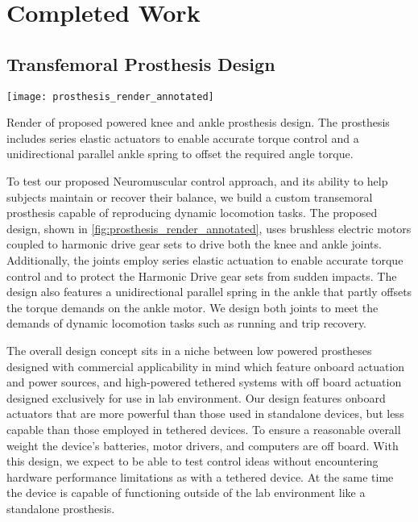 \chapter{Completed Work}\label{sec:completed_work}

\section{Transfemoral Prosthesis Design}\label{sec:completed_design}
\begin{marginfigure}[1.25in]
    \centering
    \texttt{[image: prosthesis\_render\_annotated]}
    \caption{Render of proposed powered knee and ankle prosthesis design. The
    prosthesis includes series elastic actuators to enable accurate torque
    control and a unidirectional parallel ankle spring to offset the required
    angle torque.}\label{fig:prosthesis_render_annotated}
\end{marginfigure} 

To test our proposed Neuromuscular control approach, and its ability to help
subjects maintain or recover their balance, we build a custom transemoral
prosthesis capable of reproducing dynamic locomotion tasks. The proposed design,
shown in \cref{fig:prosthesis_render_annotated}, uses brushless electric motors
coupled to harmonic drive gear sets to drive both the knee and ankle joints.
Additionally, the joints employ series elastic actuation to enable accurate
torque control and to protect the Harmonic Drive gear sets from sudden impacts.
The design also features a unidirectional parallel spring in the ankle that
partly offsets the torque demands on the ankle motor.  We design both joints to
meet the demands of dynamic locomotion tasks such as running and trip recovery.

The overall design concept sits in a niche between low powered prostheses
designed with commercial applicability in mind
\citep{sup2007design,sup2009preliminary,lawson2014robotic,rouse2015design,
martinez2011antagonistic} which feature onboard actuation and power sources, and
high-powered tethered systems \citep{caputo2013experimental,
caputo2015informing} with off board actuation designed exclusively for use in
lab environment. Our design features onboard actuators that are more powerful
than those used in standalone devices, but less capable than those employed in
tethered devices. To ensure a reasonable overall weight the device's batteries,
motor drivers, and computers are off board. With this design, we expect to be
able to test control ideas without encountering hardware performance limitations
as with a tethered device. At the same time the device is capable of functioning
outside of the lab environment like a standalone prosthesis. 

